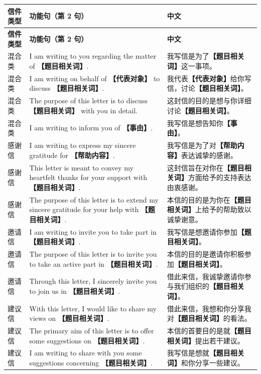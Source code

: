 \documentclass[11pt,a4paper]{ctexart}
\newcommand{\fillin}[1]{{\bfseries【#1】}}
\begin{document}
\begin{longtable}{L{2.0cm}L{9.2cm}L{4.6cm}}
\toprule
\textbf{信件类型} & \textbf{功能句（第 2 句）} & \textbf{中文} \\
\midrule
\endfirsthead
\toprule
\textbf{信件类型} & \textbf{功能句（第 2 句）} & \textbf{中文} \\
\midrule
\endhead
\bottomrule
\endlastfoot

混合类 & I am writing to you regarding the matter of \fillin{题目相关词}. & 我写信是为了\fillin{题目相关词}这一事项。 \\
混合类 & I am writing on behalf of \fillin{代表对象} to discuss \fillin{题目相关词}. & 我代表\fillin{代表对象}给你写信，讨论\fillin{题目相关词}。 \\
混合类 & The purpose of this letter is to discuss \fillin{题目相关词} with you in detail. & 这封信的目的是想与你详细讨论\fillin{题目相关词}。 \\
混合类 & I am writing to inform you of \fillin{事由}. & 我写信是想告知你\fillin{事由}。 \\
\midrule

感谢信 & I am writing to express my sincere gratitude for \fillin{帮助内容}. & 我写信是为了对\fillin{帮助内容}表达诚挚的感谢。 \\
感谢信 & This letter is meant to convey my heartfelt thanks for your support with \fillin{题目相关词}. & 这封信旨在对你在\fillin{题目相关词}方面给予的支持表达由衷感谢。 \\
感谢信 & The purpose of this letter is to extend my sincere gratitude for your help with \fillin{题目相关词}. & 本信的目的是为你在\fillin{题目相关词}上给予的帮助致以诚挚谢意。 \\
\midrule

邀请信 & I am writing to invite you to take part in \fillin{题目相关词}. & 我写信是想邀请你参加\fillin{题目相关词}。 \\
邀请信 & The purpose of this letter is to invite you to take an active part in \fillin{题目相关词}. & 本信的目的是邀请你积极参加\fillin{题目相关词}。 \\
邀请信 & Through this letter, I sincerely invite you to join us in \fillin{题目相关词}. & 借此来信，我诚挚邀请你参与我们组织的\fillin{题目相关词}。 \\
\midrule

建议信 & With this letter, I would like to share my views on \fillin{题目相关词}. & 借此来信，我想和你分享我对\fillin{题目相关词}的看法。 \\
建议信 & The primary aim of this letter is to offer some suggestions on \fillin{题目相关词}. & 本信的首要目的是就\fillin{题目相关词}提出若干建议。 \\
建议信 & I am writing to share with you some suggestions concerning \fillin{题目相关词}. & 我写信是想就\fillin{题目相关词}和你分享一些建议。 \\
\midrule


\end{longtable}
\end{document}
